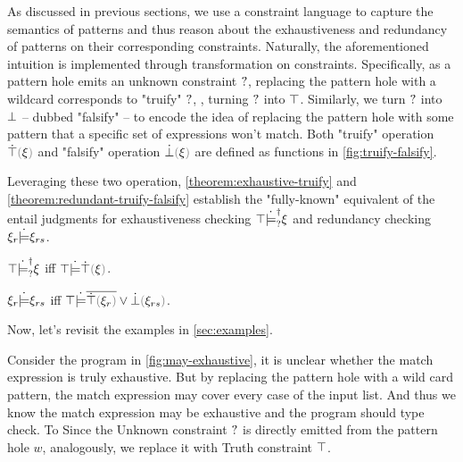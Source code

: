 As discussed in previous sections, we use a constraint language to capture the semantics of patterns and thus reason about the exhaustiveness and redundancy of patterns on their corresponding constraints. Naturally, the aforementioned intuition is implemented through transformation on constraints. Specifically, as a pattern hole emits an unknown constraint $\mathtt{?}$, replacing the pattern hole with a wildcard corresponds to "truify" $\mathtt{?}$, \ie, turning $\mathtt{?}$ into $\top$. Similarly, we turn $\mathtt{?}$ into $\bot$ -- dubbed "falsify" -- to encode the idea of replacing the pattern hole with some pattern that a specific set of expressions won't match. Both "truify" operation $\ctruify{\xi}$ and "falsify" operation $\cfalsify{\xi}$ are defined as functions in \autoref{fig:truify-falsify}. 



Leveraging these two operation, \autoref{theorem:exhaustive-truify} and \autoref{theorem:redundant-truify-falsify} establish the "fully-known" equivalent of the entail judgments for exhaustiveness checking $\top \dot{\models}_{?}^{\dag} \xi$ and redundancy checking $\xi_r \dot{\models} \xi_{rs}$.

\begin{theorem}
\label{theorem:exhaustive-truify}
  $\top \dot{\models}_{?}^{\dag} \xi$ iff $\csatisfy{\ctruth}{\ctruify{\xi}}$.
\end{theorem}

\begin{theorem}
\label{theorem:redundant-truify-falsify}
  $\xi_r \dot{\models} \xi_{rs}$ iff $\csatisfy{\ctruth}{\cor{\cdual{\ctruify{\xi_r}}}{\cfalsify{\xi_{rs}}}}$.
\end{theorem}

Now, let's revisit the examples in \autoref{sec:examples}.

Consider the program in \autoref{fig:may-exhaustive}, it is unclear whether the match expression is truly exhaustive. But by replacing the pattern hole with a wild card pattern, the match expression may cover every case of the input list. And thus we know the match expression may be exhaustive and the program should type check. To Since the Unknown constraint $\mathtt{?}$ is directly emitted from the pattern hole $w$, analogously, we replace it with Truth constraint $\top$.

